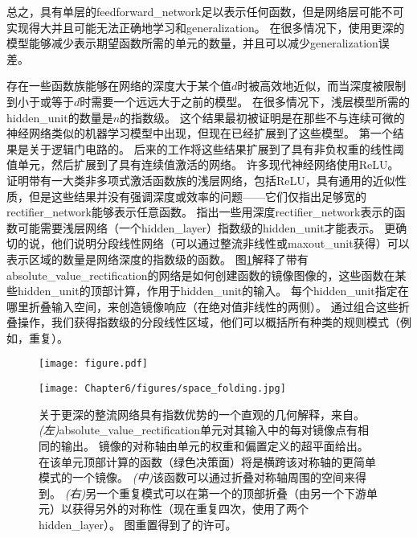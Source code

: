 总之，具有单层的\gls{feedforward_network}足以表示任何函数，但是网络层可能不可实现得大并且可能无法正确地学习和\gls{generalization}。
在很多情况下，使用更深的模型能够减少表示期望函数所需的单元的数量，并且可以减少\gls{generalization}误差。


存在一些函数族能够在网络的深度大于某个值$d$时被高效地近似，而当深度被限制到小于或等于$d$时需要一个远远大于之前的模型。
在很多情况下，浅层模型所需的\gls{hidden_unit}的数量是$n$的指数级。
这个结果最初被证明是在那些不与连续可微的神经网络类似的机器学习模型中出现，但现在已经扩展到了这些模型。
第一个结果是关于逻辑门电路的\citep{Hastad86}。
后来的工作将这些结果扩展到了具有非负权重的线性阈值单元\citep{Hastad91,Hajnal-et-al-1993}，然后扩展到了具有连续值激活的网络\citep{Maass-1992,Maass-et-al-1994}。
许多现代神经网络使用\gls{ReLU}。
\cite{Leshno-et-al-1993}证明带有一大类非多项式激活函数族的浅层网络，包括\gls{ReLU}，具有通用的近似性质，但是这些结果并没有强调深度或效率的问题——它们仅指出足够宽的\gls{rectifier_network}能够表示任意函数。
\cite{Montufar-et-al-NIPS2014}指出一些用深度\gls{rectifier_network}表示的函数可能需要浅层网络（一个\gls{hidden_layer}）指数级的\gls{hidden_unit}才能表示。
更确切的说，他们说明分段线性网络（可以通过整流非线性或\gls{maxout_unit}获得）可以表示区域的数量是网络深度的指数级的函数。%
图\ref{fig:chap6_space_folding}解释了带有\gls{absolute_value_rectification}的网络是如何创建函数的镜像图像的，这些函数在某些\gls{hidden_unit}的顶部计算，作用于\gls{hidden_unit}的输入。
每个\gls{hidden_unit}指定在哪里折叠输入空间，来创造镜像响应（在绝对值非线性的两侧）。
通过组合这些折叠操作，我们获得指数级的分段线性区域，他们可以概括所有种类的规则模式（例如，重复）。
\begin{figure}[!htb]
\ifOpenSource
\centerline{\texttt{[image: figure.pdf]}}
\else
\centerline{\texttt{[image: Chapter6/figures/space\_folding.jpg]}}
\fi
\caption{ %
关于更深的整流网络具有指数优势的一个直观的几何解释，来自\cite{Montufar-et-al-NIPS2014}。 
\emph{(左)}\gls{absolute_value_rectification}单元对其输入中的每对镜像点有相同的输出。
镜像的对称轴由单元的权重和偏置定义的超平面给出。 在该单元顶部计算的函数（绿色决策面）将是横跨该对称轴的更简单模式的一个镜像。 
\emph{(中)}该函数可以通过折叠对称轴周围的空间来得到。
\emph{(右)}另一个重复模式可以在第一个的顶部折叠（由另一个下游单元）以获得另外的对称性（现在重复四次，使用了两个\gls{hidden_layer}）。 
图重置得到了\cite{Montufar-et-al-NIPS2014}的许可。}
\label{fig:chap6_space_folding}
\end{figure}


